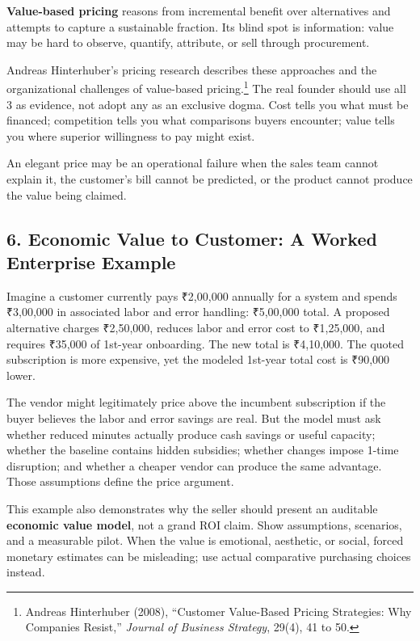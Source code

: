 \textbf{Value-based pricing} reasons from incremental benefit over alternatives and attempts to capture a sustainable fraction. Its blind spot is information: value may be hard to observe, quantify, attribute, or sell through procurement.

Andreas Hinterhuber's pricing research describes these approaches and the organizational challenges of value-based pricing.\footnote{Andreas Hinterhuber (2008), ``Customer Value-Based Pricing Strategies: Why Companies Resist,'' \emph{Journal of Business Strategy}, 29(4), 41 to 50.} The real founder should use all 3 as evidence, not adopt any as an exclusive dogma. Cost tells you what must be financed; competition tells you what comparisons buyers encounter; value tells you where superior willingness to pay might exist.

An elegant price may be an operational failure when the sales team cannot explain it, the customer's bill cannot be predicted, or the product cannot produce the value being claimed.

\subsection*{6. Economic Value to Customer: A Worked Enterprise Example}

Imagine a customer currently pays ₹2,00,000 annually for a system and spends ₹3,00,000 in associated labor and error handling: ₹5,00,000 total. A proposed alternative charges ₹2,50,000, reduces labor and error cost to ₹1,25,000, and requires ₹35,000 of 1st-year onboarding. The new total is ₹4,10,000. The quoted subscription is more expensive, yet the modeled 1st-year total cost is ₹90,000 lower.

The vendor might legitimately price above the incumbent subscription if the buyer believes the labor and error savings are real. But the model must ask whether reduced minutes actually produce cash savings or useful capacity; whether the baseline contains hidden subsidies; whether changes impose 1-time disruption; and whether a cheaper vendor can produce the same advantage. Those assumptions define the price argument.

This example also demonstrates why the seller should present an auditable \textbf{economic value model}, not a grand ROI claim. Show assumptions, scenarios, and a measurable pilot. When the value is emotional, aesthetic, or social, forced monetary estimates can be misleading; use actual comparative purchasing choices instead.

